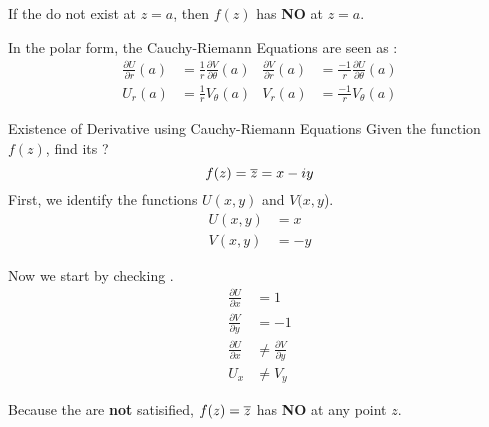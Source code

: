 \begin{remark*}
  If the  do not exist at $z = a$, then $f(z)$ has \textbf{NO}  at $z = a$.
\end{remark*}
In the polar form, the Cauchy-Riemann Equations are seen as :
\begin{subequations}\label{eq:Cauchy_Riemann_Equations-Polar}
  \begin{equation}\label{subeq:Cauchy_Riemann_Equations-UrVt}
    \begin{aligned}
      \frac{\partial U}{\partial r} (a) &= \frac{1}{r} \frac{\partial V}{\partial \theta} (a)\\
      U_{r} (a) &= \frac{1}{r} V_{\theta} (a)
    \end{aligned}
  \end{equation}
  \begin{equation}\label{subeq:Cauchy_Riemann_Equations-UtVr}
    \begin{aligned}
      \frac{\partial V}{\partial r} (a) &= \frac{-1}{r} \frac{\partial U}{\partial \theta} (a) \\
      V_{r} (a) &= \frac{-1}{r} V_{\theta} (a)
    \end{aligned}
  \end{equation}
\end{subequations}

\begin{example}[Lecture 5]{Existence of Derivative using Cauchy-Riemann Equations}
  Given the function $f(z)$, find its ?
  \begin{equation*}
    f(z) = \overline{z} = x - iy
  \end{equation*}
  \tcblower{}
  First, we identify the functions $U(x, y)$ and $V(x, y$).
  \begin{align*}
    U(x, y) &= x \\
    V(x, y) &= -y
  \end{align*}

  Now we start by checking .
  \begin{align*}
    \frac{\partial U}{\partial x} &= 1 \\
    \frac{\partial V}{\partial y} &= -1 \\
    \frac{\partial U}{\partial x} &\neq \frac{\partial V}{\partial y} \\
    U_{x} &\neq V_{y}
  \end{align*}

  Because the  are \textbf{not} satisified, $f(z) = \overline{z}$ has \textbf{NO}  at any point $z$.
\end{example}

